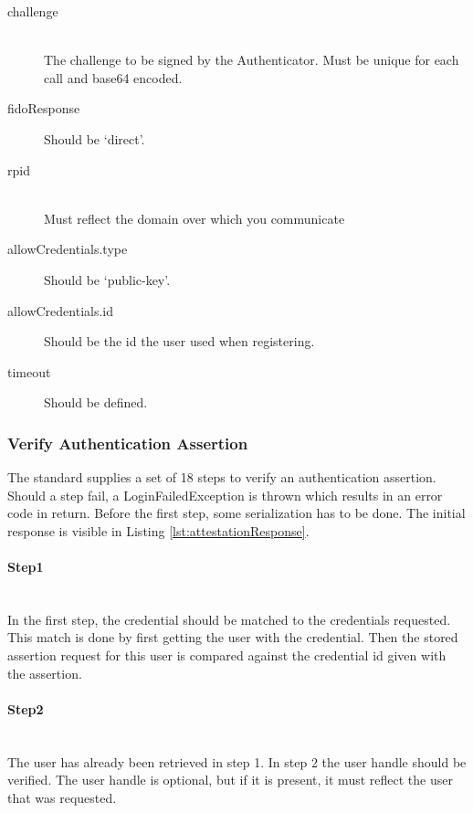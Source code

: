 \documentclass[a4paper, 11pt]{scrartcl}
\begin{document}
\begin{description}
  \item[challenge] \hfill \\ The challenge to be signed by the Authenticator. Must be unique for each call and \gls{base64} encoded.
  \item[fidoResponse] Should be `direct'. 
  \item[rpid] \hfill \\ Must reflect the domain over which you communicate
  \item[allowCredentials.type] Should be `public-key'. 
  \item[allowCredentials.id] Should be the id the user used when registering.
  \item[timeout] Should be defined.   
\end{description}

\subsubsection{Verify Authentication Assertion}

The standard supplies a set of 18 steps to verify an authentication assertion. Should a step fail, a LoginFailedException is thrown which results in an error code in return. Before the first step, some serialization has to be done. The initial response is visible in Listing \ref{lst:attestationResponse}.



\paragraph{Step1}\hfill \\ 
In the first step, the credential should be matched to the credentials requested. This match is done by first getting the user with the credential. Then the stored assertion request for this user is compared against the credential id given with the assertion.

\paragraph{Step2}\hfill \\ 
The user has already been retrieved in step 1. In step 2 the user handle should be verified. The user handle is optional, but if it is present, it must reflect the user that was requested.
\end{document}
